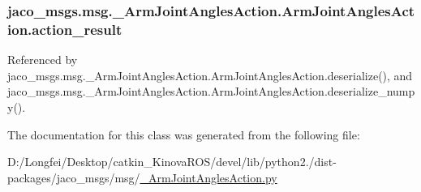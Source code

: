 \subsubsection[{\texorpdfstring{action\+\_\+result}{action_result}}]{\setlength{\rightskip}{0pt plus 5cm}jaco\+\_\+msgs.\+msg.\+\_\+\+Arm\+Joint\+Angles\+Action.\+Arm\+Joint\+Angles\+Action.\+action\+\_\+result}\hypertarget{classjaco__msgs_1_1msg_1_1__ArmJointAnglesAction_1_1ArmJointAnglesAction_ac598eb04beb335c402cad157a16c96e5}{}\label{classjaco__msgs_1_1msg_1_1__ArmJointAnglesAction_1_1ArmJointAnglesAction_ac598eb04beb335c402cad157a16c96e5}


Referenced by jaco\+\_\+msgs.\+msg.\+\_\+\+Arm\+Joint\+Angles\+Action.\+Arm\+Joint\+Angles\+Action.\+deserialize(), and jaco\+\_\+msgs.\+msg.\+\_\+\+Arm\+Joint\+Angles\+Action.\+Arm\+Joint\+Angles\+Action.\+deserialize\+\_\+numpy().



The documentation for this class was generated from the following file\+:\begin{DoxyCompactItemize}
\item 
D\+:/\+Longfei/\+Desktop/catkin\+\_\+\+Kinova\+R\+O\+S/devel/lib/python2./dist-\/packages/jaco\+\_\+msgs/msg/\hyperlink{__ArmJointAnglesAction_8py}{\+\_\+\+Arm\+Joint\+Angles\+Action.\+py}\end{DoxyCompactItemize}
